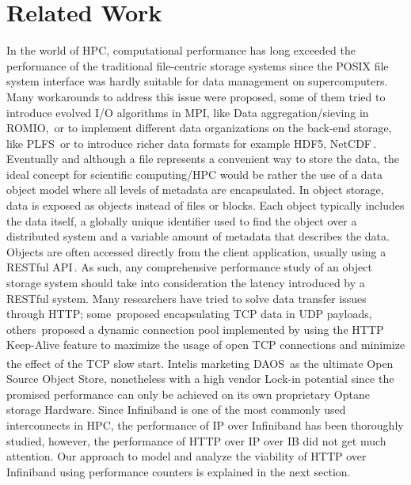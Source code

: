 \documentclass[runningheads]{llncs}
\begin{document}
\section {Related Work} \label{sec:related}

In the world of HPC, computational performance has long exceeded the performance of the traditional file-centric storage systems since the POSIX file system interface was hardly suitable for data management on supercomputers\cite{zadok2017posix}. Many workarounds to address this issue were proposed, some of them tried to introduce evolved I/O algorithms in MPI, like Data aggregation/sieving in ROMIO,\,\cite{datasievingromio} or to implement different data organizations on the back-end storage, like PLFS\,\cite{bent2009plfs} or to introduce richer data formats for example HDF5, NetCDF\,\cite{hdf5}.
Eventually and although a file represents a convenient way to store the data, the ideal concept for scientific computing/HPC would be rather the use of a data object model\cite{liu2018evaluation} where all levels of metadata are encapsulated. In object storage, data is exposed as objects instead of files or blocks. Each object typically includes the data itself, a globally unique identifier used to find the object over a distributed system and a variable amount of metadata that describes the data.
Objects are often accessed directly from the client application, usually using a RESTful API\,\cite{richardson2008restful}.
As such, any comprehensive performance study of an object storage system should take into consideration the latency introduced by a RESTful system.
Many researchers have tried to solve data transfer issues through HTTP; some\,\cite{forest} proposed encapsulating TCP data in UDP payloads, others\,\cite {Devresse} proposed a dynamic connection pool implemented by using the HTTP Keep-Alive feature to maximize the usage of open TCP connections and minimize the effect of the TCP slow start. Intel\textsuperscript \textregistered  is marketing DAOS\,\cite{DAOS} as the ultimate Open Source Object Store, nonetheless with a high vendor Lock-in potential since the promised performance can only be achieved on its own proprietary Optane\,\cite{Optane} storage Hardware.
Since Infiniband \cite{Infiniband} is one of the most commonly used interconnects in HPC, the performance of IP over Infiniband \cite{bortolotti2011comparison,grant2010study} has been thoroughly studied, however, the performance of HTTP over IP over IB did not get much attention. Our approach to model and analyze the viability of HTTP over Infiniband using performance counters is explained in the next section.
\end{document}
